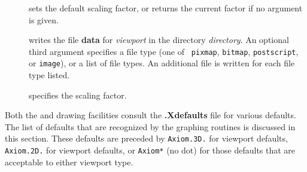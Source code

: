 \begin{description}
%
\item[]
sets the default scaling factor, or returns
the current factor if no argument is given.

%
\item[]
writes the file {\bf data} for {\it viewport}
in the directory {\it directory}.
An optional third argument specifies a file type (one of {\tt
pixmap}, {\tt bitmap}, {\tt postscript}, or {\tt image}), or a
list of file types.
An additional file is written for each file type listed.

%
\item[]
specifies the scaling factor.
\end{description}
\egroup


Both the \twodim{} and \threedim{} drawing facilities consult
the {\bf .Xdefaults} file for various defaults.
The list of defaults that are recognized by the graphing routines
is discussed in this section.
These defaults are preceded by {\tt Axiom.3D.}
for \threedim{} viewport defaults, {\tt Axiom.2D.}
for \twodim{} viewport defaults, or {\tt Axiom*} (no dot) for
those defaults that are acceptable to either viewport type.

